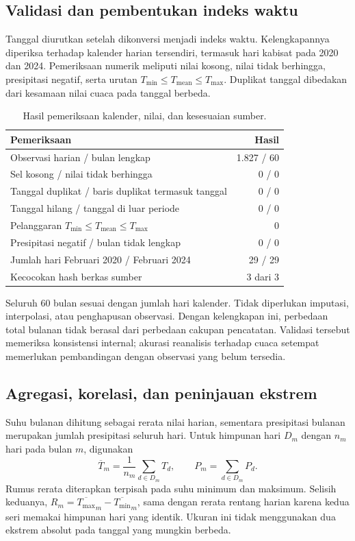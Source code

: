 \documentclass[12pt,a4paper]{article}
\begin{document}
\subsection{Validasi dan pembentukan indeks waktu}
Tanggal diurutkan setelah dikonversi menjadi indeks waktu. Kelengkapannya diperiksa terhadap kalender harian tersendiri, termasuk hari kabisat pada 2020 dan 2024. Pemeriksaan numerik meliputi nilai kosong, nilai tidak berhingga, presipitasi negatif, serta urutan $T_{\min}\leq T_{\mathrm{mean}}\leq T_{\max}$. Duplikat tanggal dibedakan dari kesamaan nilai cuaca pada tanggal berbeda.
\begin{table}[htbp]\centering\footnotesize
\caption{Hasil pemeriksaan kalender, nilai, dan kesesuaian sumber.}
\begin{tabularx}{\textwidth}{@{}Xr@{}}\toprule
Pemeriksaan & Hasil\\\midrule
Observasi harian / bulan lengkap & 1.827 / 60\\
Sel kosong / nilai tidak berhingga & 0 / 0\\
Tanggal duplikat / baris duplikat termasuk tanggal & 0 / 0\\
Tanggal hilang / tanggal di luar periode & 0 / 0\\
Pelanggaran $T_{\min}\leq T_{\mathrm{mean}}\leq T_{\max}$ & 0\\
Presipitasi negatif / bulan tidak lengkap & 0 / 0\\
Jumlah hari Februari 2020 / Februari 2024 & 29 / 29\\
Kecocokan hash berkas sumber & 3 dari 3\\\bottomrule
\end{tabularx}
\end{table}
Seluruh 60 bulan sesuai dengan jumlah hari kalender. Tidak diperlukan imputasi, interpolasi, atau penghapusan observasi. Dengan kelengkapan ini, perbedaan total bulanan tidak berasal dari perbedaan cakupan pencatatan. Validasi tersebut memeriksa konsistensi internal; akurasi reanalisis terhadap cuaca setempat memerlukan pembandingan dengan observasi yang belum tersedia.

\subsection{Agregasi, korelasi, dan peninjauan ekstrem}
Suhu bulanan dihitung sebagai rerata nilai harian, sementara presipitasi bulanan merupakan jumlah presipitasi seluruh hari. Untuk himpunan hari $D_m$ dengan $n_m$ hari pada bulan $m$, digunakan
\begin{equation}
\overline{T}_m=\frac{1}{n_m}\sum_{d\in D_m}T_d,
\qquad P_m=\sum_{d\in D_m}P_d.
\end{equation}
Rumus rerata diterapkan terpisah pada suhu minimum dan maksimum. Selisih keduanya, $R_m=\overline{T_{\max}}_m-\overline{T_{\min}}_m$, sama dengan rerata rentang harian karena kedua seri memakai himpunan hari yang identik. Ukuran ini tidak menggunakan dua ekstrem absolut pada tanggal yang mungkin berbeda.
\end{document}
